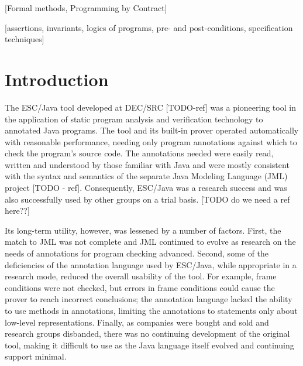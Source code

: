 \documentclass{acm_proc_article-sp}
\begin{document}
[Formal methods, Programming by Contract]

[assertions, invariants, logics of programs,
                pre- and post-conditions, specification techniques]



\section{Introduction}
The ESC/Java tool developed at DEC/SRC [TODO-ref] was a pioneering tool
in the application of static program analysis and verification technology
to annotated Java programs.  The tool and its built-in prover operated 
automatically with reasonable performance, needing only program annotations
against which to check the program's source code.  The annotations needed were
easily read, written and understood by those familiar with Java and were mostly
consistent with the syntax and semantics of the separate Java Modeling Language 
(JML) project [TODO - ref].  Consequently, ESC/Java was a
research success and was also successfully used by other groups on a trial 
basis.  [TODO do we need a ref here??]

Its long-term utility, however, was lessened by a number of factors.  First, 
the match to JML was not complete and JML continued to evolve as research on
the needs of annotations for program checking advanced.  Second, some of the
deficiencies of the annotation language used by ESC/Java, while appropriate 
in a research mode, reduced the overall usability of the tool.  For example,
frame conditions were not checked, but errors in frame conditions could cause
the prover to reach incorrect conclusions; the annotation language lacked 
the ability to use methods in annotations, limiting the annotations to statements
only about low-level representations.  Finally,
as companies
were bought and sold and research groups disbanded, there was no continuing
development of the original tool, making it difficult to use as the Java language
itself evolved and continuing support minimal.
\end{document}
